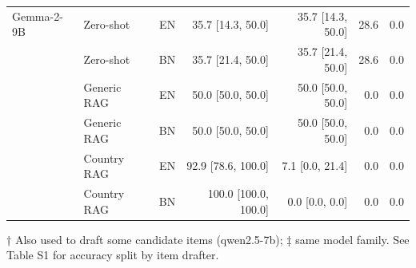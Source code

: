 \begin{table}[t]
\begin{tabular}{llrrrrr}
\addlinespace
Gemma-2-9B & Zero-shot & EN & 35.7 [14.3, 50.0] & 35.7 [14.3, 50.0] & 28.6 & 0.0 \\
 & Zero-shot & BN & 35.7 [21.4, 50.0] & 35.7 [21.4, 50.0] & 28.6 & 0.0 \\
 & Generic RAG & EN & 50.0 [50.0, 50.0] & 50.0 [50.0, 50.0] & 0.0 & 0.0 \\
 & Generic RAG & BN & 50.0 [50.0, 50.0] & 50.0 [50.0, 50.0] & 0.0 & 0.0 \\
 & Country RAG & EN & 92.9 [78.6, 100.0] & 7.1 [0.0, 21.4] & 0.0 & 0.0 \\
 & Country RAG & BN & 100.0 [100.0, 100.0] & 0.0 [0.0, 0.0] & 0.0 & 0.0 \\
\bottomrule
\end{tabular}
\par\smallskip\parbox{\linewidth}{\scriptsize † Also used to draft some candidate items (qwen2.5-7b); ‡ same model family. See Table S1 for accuracy split by item drafter.}
\end{table}

